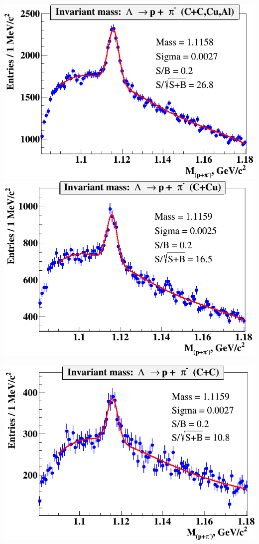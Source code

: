 \documentclass[dvipsnames] {beamer}
\begin{document}
\begin{frame}
\begin{columns}[t]
\begin{block}{\bf {}}
\begin{minipage}{.49\linewidth}
        \includegraphics[width=1.\linewidth]{lambda_all.png} \\ 
        \includegraphics[width=1.\linewidth]{lambda_Cu.png}
      \end{minipage}
      \begin{minipage}{.49\linewidth}
        \includegraphics[width=1.\linewidth]{lambda_C.png} \\

\end{minipage}
\end{block}
\end{columns}
\end{frame}
\end{document}
